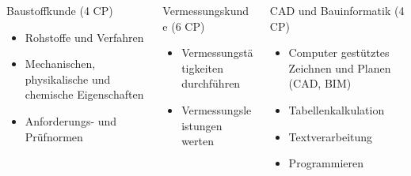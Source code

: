 \documentclass[slidestop,compress,mathserif, aspectratio = 169, 9pt]{beamer}
\begin{document}
{ \begin{columns}[t] 
     \begin{column}[T]{4.5cm} 
     Baustoffkunde (4 CP)
     	\begin{itemize}
     	\item Rohstoffe und Verfahren
	\item Mechanischen, physikalische und chemische Eigenschaften 
	\item Anforderungs- und Prüfnormen
	 \end{itemize}
     \end{column}
     	\begin{column}[T]{4.5cm} 
	Vermessungskunde (6 CP)
     	\begin{itemize}
     	\item Vermessungstätigkeiten durchf\"uhren
	\item Vermessungsleistungen werten
     	\end{itemize}
     \end{column}
     \begin{column}[T]{4.5cm} 
     CAD und Bauinformatik (4 CP)
     	\begin{itemize}
     	\item Computer gestütztes Zeichnen und Planen (CAD, BIM)
	\item Tabellenkalkulation
	\item Textverarbeitung
	\item Programmieren
     	\end{itemize}
     \end{column}
 \end{columns}

}

\end{document}
